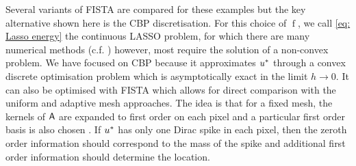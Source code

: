 \documentclass[smallextended]{svjour3}
\newcommand{\op}[1]{\operatorname{#1}}
\newcommand{\1}{\F{1}}
\newcommand{\meshsize}{h}
\newcommand*{\var}[1]{%
	\IfEqCase{#1}{%
		{0}{u}%
		{1}{v}%
		{2}{w}%
	}[u#1]%
}
\begin{document}
	Several variants of FISTA are compared for these examples but the key alternative shown here is the CBP discretisation. For this choice of $\op{f}$, we call \eqref{eq: Lasso energy} the continuous LASSO problem, for which there are many numerical methods (c.f. \cite{Bredies2013,Castro2016,Boyd2017,Catala2019}) however, most require the solution of a non-convex problem. We have focused on CBP because it approximates $\var0^*$ through a convex discrete optimisation problem which is asymptotically exact in the limit $\meshsize\to0$. It can also be optimised with FISTA which allows for direct comparison with the uniform and adaptive mesh approaches. The idea is that for a fixed mesh, the kernels of $\mathsf{A}$ are expanded to first order on each pixel and a particular first order basis is also chosen \cite{Ekanadham2011,Duval2017b}. If $\var0^*$ has only one Dirac spike in each pixel, then the zeroth order information should correspond to the mass of the spike and additional first order information should determine the location.
	
\end{document}
